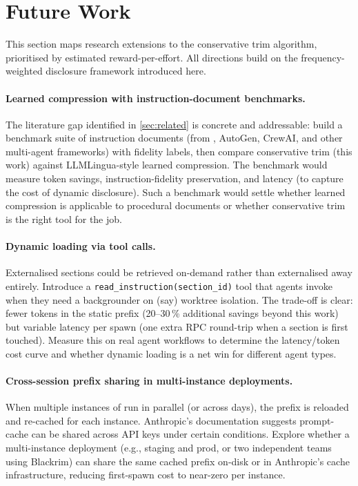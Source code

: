 \section{Future Work}
\label{sec:future}

This section maps research extensions to the conservative trim algorithm,
prioritised by estimated reward-per-effort. All directions build on the
frequency-weighted disclosure framework introduced here.

\paragraph{Learned compression with instruction-document benchmarks.}

The literature gap identified in \cref{sec:related} is concrete and addressable:
build a benchmark suite of instruction documents (from \blackrim, AutoGen,
CrewAI, and other multi-agent frameworks) with fidelity labels, then compare
conservative trim (this work) against LLMLingua-style learned compression.
The benchmark would measure token savings, instruction-fidelity preservation,
and latency (to capture the cost of dynamic disclosure). Such a benchmark
would settle whether learned compression is applicable to procedural documents
or whether conservative trim is the right tool for the job.

\paragraph{Dynamic loading via tool calls.}

Externalised sections could be retrieved on-demand rather than externalised
away entirely. Introduce a \texttt{read\_instruction(section\_id)} tool that
agents invoke when they need a backgrounder on (say) worktree isolation.
The trade-off is clear: fewer tokens in the static prefix (20--30\,\% additional
savings beyond this work) but variable latency per spawn (one extra RPC
round-trip when a section is first touched). Measure this on real agent
workflows to determine the latency/token cost curve and whether
dynamic loading is a net win for different agent types.

\paragraph{Cross-session prefix sharing in multi-instance deployments.}

When multiple instances of \blackrim run in parallel (or across days), the
\claudemd prefix is reloaded and re-cached for each instance. Anthropic's
documentation suggests prompt-cache can be shared across API keys under
certain conditions. Explore whether a multi-instance deployment (e.g.,
staging and prod, or two independent teams using Blackrim) can share
the same cached prefix on-disk or in Anthropic's cache infrastructure,
reducing first-spawn cost to near-zero per instance.

